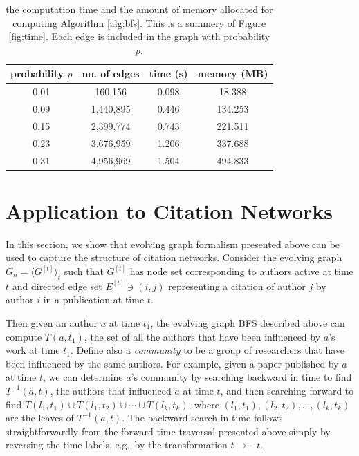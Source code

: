 \documentclass[10pt,conference,compsocconf]{IEEEtran}
\theoremstyle{definition}
\begin{document}
\begin{table}[h]
\centering
\begin{tabular}{c | c | c | c }
\hline
probability $p$ & no. of edges  & time (s) &  memory (MB) \\\hline
      0.01  &         160,156      & 0.098   & 18.388  \\
      0.09  &       1,440,895        & 0.446  &  134.253  \\
      0.15   &     2,399,774         & 0.743 & 221.511 \\
      0.23   &    3,676,959          & 1.206 &   337.688 \\
      0.31   &     4,956,969          & 1.504  &  494.833 \\
\end{tabular}
\caption{the computation time and the amount of memory allocated for 
computing Algorithm \ref{alg:bfs}. This is a summery of Figure \ref{fig:time}.  
Each edge is included in the graph with probability $p$. }
\label{tab:bfs}
\end{table}

\section{Application to Citation Networks}
\label{sec:applications}

In this section, we show that evolving graph formalism presented above can be
used to capture the structure of citation networks. Consider
the evolving graph $G_n=\langle G^{[t]} \rangle_t$ such that $G^{[t]}$ has
node set corresponding to authors active at time $t$ and directed edge set
$E^{[t]} \ni (i, j)$ representing a citation of author $j$ by author $i$ in a
publication at time $t$.

Then given an author $a$ at time $t_1$, the evolving graph BFS described above
can compute $T(a, t_1)$, the set of all the authors that have been influenced by
$a$'s work at time $t_1$.
Define also a \emph{community} to be a group of
researchers that have been influenced by the same authors.
For example, given a paper published by $a$ at time $t$,
we can determine $a$'s community by searching backward in time to find
$T^{-1}(a, t)$, the authors that influenced $a$ at time $t$, and then searching
forward to find $T(l_1, t_1) \cup T(l_1, t_2) \cup \cdots \cup T(l_k, t_k)$, where
$(l_1,t_1), (l_2, t_2), \ldots, (l_k, t_k)$ are the leaves of $T^{-1}(a,t)$.
The backward search in time follows straightforwardly from the forward time traversal
presented above simply by reversing the time labels, e.g.\ by the transformation
$t\rightarrow -t$.
\end{document}
